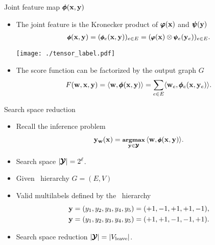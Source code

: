 \documentclass[first=dgreen,second=purple,logo=yellowexc]{aaltoslides}
\begin{document}
%
\begin{frame}{Joint feature map $\pmb \phi(\mathbf {x},\mathbf {y})$}
	\begin{itemize}\footnotesize
		\item The joint feature is the Kronecker product of $\pmb \varphi(\mathbf {x})$ and $\pmb \psi(\mathbf {y})$
		\begin{align*}\footnotesize
			\pmb \phi(\mathbf {x},\mathbf {y}) = (\pmb \phi_e(\mathbf {x},\mathbf {y}))_{e\in E}=(\pmb \varphi(\mathbf {x})\otimes\pmb \psi_e(\mathbf {y}_e))_{e\in E}.
		\end{align*}
		\begin{center}
			\texttt{[image: ./tensor\_label.pdf]}
		\end{center}
		\item The score function can be factorized by the output graph $G$
		\begin{align*}
			F(\mathbf {w},\mathbf {x},\mathbf {y}) = \langle \mathbf {w}, \pmb \phi(\mathbf {x},\mathbf {y}) \rangle = \sum_{e\in E}\langle \mathbf {w}_e, \pmb \phi_e(\mathbf {x},\mathbf {y}_e) \rangle.
		\end{align*}
	\end{itemize}
\end{frame}

\begin{frame}{Search space reduction}
	\begin{itemize}
		\item Recall the inference problem
		\begin{align*}\footnotesize
			\mathbf {y}_{\mathbf {w}}(\mathbf {x}) = \underset{\mathbf {y}\in\pmb {\mathcal{Y}}}{\textbf{argmax}}\,\langle \mathbf {w}, \pmb \phi(\mathbf {x},\mathbf {y}) \rangle.
		\end{align*}
		\item Search space $|\pmb {\mathcal{Y}}| = 2^{\ell}$.
		\item Given \tc\ hierarchy $G=(E,V)$
		\begin{center}
		\end{center}
		\item Valid multilabels defined by the \tc\ hierarchy
		\begin{align*}
			\mathbf {y}&=(y_1,y_2,y_3,y_4,y_5)=(+1,-1,+1,+1,-1),\\
			\mathbf {y}&=(y_1,y_2,y_3,y_4,y_5)=(+1,+1,-1,-1,+1).
		\end{align*}
		\item Search space reduction $|\pmb {\mathcal{Y}}| = |V_{\text{leave}}|$.
	\end{itemize}
\end{frame}
\end{document}
